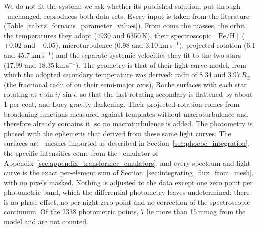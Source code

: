 We do not fit the system: we ask whether its published solution, put through \spice\ unchanged,
reproduces both data sets. Every input is taken from the literature
(Table~\ref{tab:tz_fornacis_parameter_values}). From \citet{tz_fornacis_orbit} come the masses, the orbit,
the temperatures they adopt (4930 and 6350\,K), their spectroscopic $[\mathrm{Fe/H}]$ ($+0.02$ and
$-0.05$), microturbulence (0.98 and 3.10\,km\,s$^{-1}$), projected rotation (6.1 and 45.7\,km\,s$^{-1}$)
and the separate systemic velocities they fit to the two stars (17.99 and 18.35\,km\,s$^{-1}$). The
geometry is that of their light-curve model, from which the adopted secondary temperature was derived:
radii of 8.34 and 3.97\,$R_\odot$ (the fractional radii of \citealt{Andersen1991} on their semi-major
axis), Roche surfaces with each star rotating at $v\sin i / \sin i$, so that the fast-rotating secondary
is flattened by about 1 per cent, and Lucy gravity darkening. Their projected rotation comes from
broadening functions measured against templates without macroturbulence and therefore already contains
it, so no macroturbulence is added. The photometry is phased with the ephemeris that
\citet{Andersen1991} derived from these same light curves. The surfaces are \phoebe\ meshes imported as
described in Section~\ref{sec:phoebe_integration}, the specific intensities come from the \tpayne\
emulator of Appendix~\ref{sec:appendix_transformer_emulators}, and every spectrum and light curve is the
exact per-element sum of Section~\ref{sec:integrating_flux_from_mesh}, with no pixels masked. Nothing is adjusted to the data except one zero point per photometric band, which the
differential photometry leaves undetermined; there is no phase offset, no per-night zero point and no
correction of the spectroscopic continuum. Of the 2338 photometric points, 7 lie more than 15\,mmag from
the model and are not counted.


